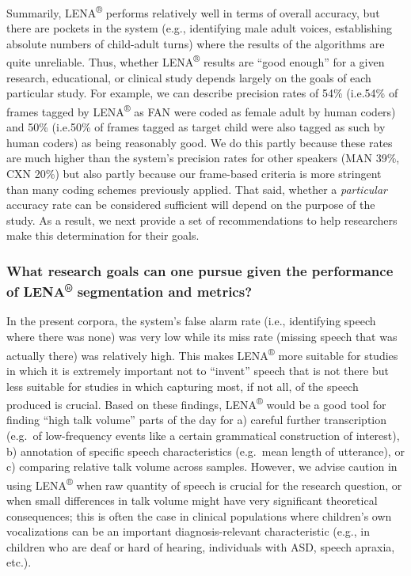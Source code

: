 \documentclass[english,table,man,floatsintext]{apa6}
\begin{document}
Summarily, LENA\textsuperscript{®} performs relatively well in terms of overall accuracy, but there are pockets in the system (e.g., identifying male adult voices, establishing absolute numbers of child-adult turns) where the results of the algorithms are quite unreliable. Thus, whether LENA\textsuperscript{®} results are \enquote{good enough} for a given research, educational, or clinical study depends largely on the goals of each particular study. For example, we can describe precision rates of 54\% (i.e.54\% of frames tagged by LENA\textsuperscript{®} as FAN were coded as female adult by human coders) and 50\% (i.e.50\% of frames tagged as target child were also tagged as such by human coders) as being reasonably good. We do this partly because these rates are much higher than the system's precision rates for other speakers (MAN 39\%, CXN 20\%) but also partly because our frame-based criteria is more stringent than many coding schemes previously applied. That said, whether a \emph{particular} accuracy rate can be considered sufficient will depend on the purpose of the study. As a result, we next provide a set of recommendations to help researchers make this determination for their goals.

\hypertarget{what-research-goals-can-one-pursue-given-the-performance-of-lena-segmentation-and-metrics}{%
\subsubsection{\texorpdfstring{What research goals can one pursue given the performance of LENA\textsuperscript{®} segmentation and metrics?}{What research goals can one pursue given the performance of LENA® segmentation and metrics?}}\label{what-research-goals-can-one-pursue-given-the-performance-of-lena-segmentation-and-metrics}}

In the present corpora, the system's false alarm rate (i.e., identifying speech where there was none) was very low while its miss rate (missing speech that was actually there) was relatively high. This makes LENA\textsuperscript{®} more suitable for studies in which it is extremely important not to \enquote{invent} speech that is not there but less suitable for studies in which capturing most, if not all, of the speech produced is crucial. Based on these findings, LENA\textsuperscript{®} would be a good tool for finding \enquote{high talk volume} parts of the day for a) careful further transcription (e.g.~of low-frequency events like a certain grammatical construction of interest), b) annotation of specific speech characteristics (e.g.~mean length of utterance), or c) comparing relative talk volume across samples. However, we advise caution in using LENA\textsuperscript{®} when raw quantity of speech is crucial for the research question, or when small differences in talk volume might have very significant theoretical consequences; this is often the case in clinical populations where children's own vocalizations can be an important diagnosis-relevant characteristic (e.g., in children who are deaf or hard of hearing, individuals with ASD, speech apraxia, etc.).
\end{document}
